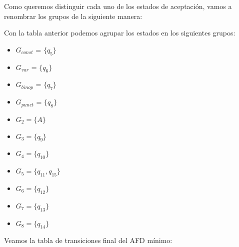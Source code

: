 Como queremos distinguir cada uno de los estados de aceptación, vamos a renombrar los grupos de la siguiente manera:


Con la tabla anterior podemos agrupar los estados en los siguientes grupos:
\begin{itemize}
    \item $G_{const}$ =  $\{q_5\}$
    \item $G_{var}$ =  $\{q_6\}$
    \item $G_{binop}$ =  $\{q_7\}$
    \item $G_{punct}$ =  $\{q_8\}$
    \item $G_2 = \{A\}$
    \item $G_3 = \{q_9\}$
    \item $G_4 = \{q_{10}\}$
    \item $G_5 = \{q_{11},q_{15}\}$
    \item $G_6 = \{q_{12}\}$
    \item $G_7 = \{q_{13}\}$
    \item $G_8 = \{q_{14}\}$
\end{itemize}

Veamos la tabla de transiciones final del AFD mínimo:

